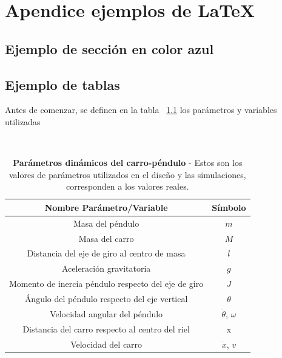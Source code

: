 \chapter{Apendice ejemplos de \LaTeX}

    \section{\textcolor{Azul}{Ejemplo de sección en color azul}}

    \section{Ejemplo de tablas}

        Antes de comenzar, se definen  en la tabla ~\ref{tab:tabla} los parámetros y variables utilizadas

        \begin{table}[htdp]                             %
            \centering\                                     %
                \begin{tabular}{||c | c ||}                     %
                \hline                                          %
                \hline
                Nombre Parámetro/Variable & Símbolo\\
                \hline
                \hline
                Masa del péndulo & $m$ \\
                \hline
                Masa del carro & $M$\\
                \hline
                Distancia del eje de giro al centro de masa & $l$ \\
                \hline
                Aceleración gravitatoria & $g$ \\
                \hline
                Momento de inercia péndulo respecto del eje de giro& $J$ \\
                \hline
                Ángulo del péndulo respecto del eje vertical & $\theta$\\
                \hline
                Velocidad angular del péndulo & $\dot{\theta}$, $\omega$\\
                \hline
                Distancia del carro respecto al centro del riel & x\\
                \hline
                Velocidad del carro & $\dot{x}$, $v$\\
                \hline
                \hline
                \end{tabular}
            \caption[Parámetros dinámicos del carro-péndulo]{\textbf{Parámetros dinámicos del carro-péndulo} - Estos son los valores de parámetros utilizados en el diseño y las simulaciones, corresponden a los valores reales.}
            \label{tab:tabla}                              %
        \end{table}

